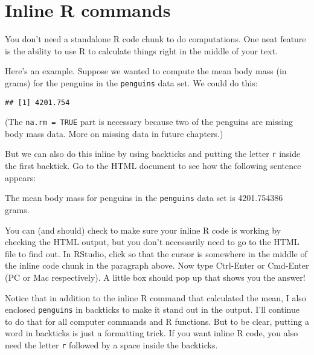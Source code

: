 \documentclass[
]{book}
\newenvironment{Shaded}{\begin{snugshade}}{\end{snugshade}}
\newcommand{\AttributeTok}[1]{\textcolor[rgb]{0.77,0.63,0.00}{#1}}
\newcommand{\ConstantTok}[1]{\textcolor[rgb]{0.00,0.00,0.00}{#1}}
\newcommand{\FunctionTok}[1]{\textcolor[rgb]{0.00,0.00,0.00}{#1}}
\newcommand{\NormalTok}[1]{#1}
\newcommand{\SpecialCharTok}[1]{\textcolor[rgb]{0.00,0.00,0.00}{#1}}
\begin{document}
\hypertarget{rmark-inline}{%
\section{Inline R commands}\label{rmark-inline}}

You don't need a standalone R code chunk to do computations. One neat feature is the ability to use R to calculate things right in the middle of your text.

Here's an example. Suppose we wanted to compute the mean body mass (in grams) for the penguins in the \texttt{penguins} data set. We could do this:

\begin{Shaded}
\end{Shaded}

\begin{verbatim}
## [1] 4201.754
\end{verbatim}

(The \texttt{na.rm\ =\ TRUE} part is necessary because two of the penguins are missing body mass data. More on missing data in future chapters.)

But we can also do this inline by using backticks and putting the letter \texttt{r} inside the first backtick. Go to the HTML document to see how the following sentence appears:

The mean body mass for penguins in the \texttt{penguins} data set is 4201.754386 grams.

You can (and should) check to make sure your inline R code is working by checking the HTML output, but you don't necessarily need to go to the HTML file to find out. In RStudio, click so that the cursor is somewhere in the middle of the inline code chunk in the paragraph above. Now type Ctrl-Enter or Cmd-Enter (PC or Mac respectively). A little box should pop up that shows you the answer!

Notice that in addition to the inline R command that calculated the mean, I also enclosed \texttt{penguins} in backticks to make it stand out in the output. I'll continue to do that for all computer commands and R functions. But to be clear, putting a word in backticks is just a formatting trick. If you want inline R code, you also need the letter \texttt{r} followed by a space inside the backticks.
\end{document}
